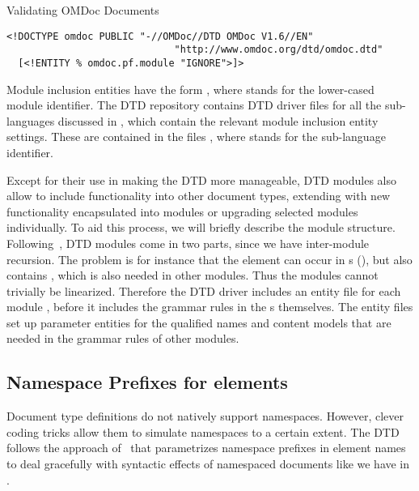 \begin{module}[id=validating]
\begin{omgroup}[id=validating]{Validating OMDoc Documents}
\begin{lstlisting}[index={omdoc,DOCTYPE,ENTITY,INGNORE}]
<!DOCTYPE omdoc PUBLIC "-//OMDoc//DTD OMDoc V1.6//EN"
                             "http://www.omdoc.org/dtd/omdoc.dtd"
  [<!ENTITY % omdoc.pf.module "IGNORE">]>
\end{lstlisting}

Module inclusion entities have the form {}, where
{} stands for the lower-cased module identifier. The {\omdoc} DTD
repository contains DTD driver files for all the sub-languages discussed in
{}, which contain the relevant module inclusion entity
settings. These are contained in the files {}, where
{} stands for the sub-language identifier.

Except for their use in making the {\omdoc} DTD more manageable, DTD modules also allow to
include {\omdoc} functionality into other document types, extending {\omdoc} with new
functionality encapsulated into modules or upgrading selected {\omdoc} modules
individually. To aid this process, we will briefly describe the module structure.
Following~\cite{AltBou:mox01}, DTD modules come in two parts, since we have inter-module
recursion. The problem is for instance that the {} element can occur in
{s} ({}), but also contains {},
which is also needed in other modules. Thus the modules cannot trivially be linearized.
Therefore the DTD driver includes an entity file {} for each
module {}, before it includes the grammar rules in the
{s} {} themselves. The entity files
set up parameter entities for the qualified names and content models that are needed in
the grammar rules of other modules.


\subsection{Namespace Prefixes for {\omdoc} elements}\label{subsec:namespace-magic}  
Document type definitions do not natively support {\xml}
namespaces. However, clever coding tricks allow them to simulate
namespaces to a certain extent. The {\omdoc} DTD follows the approach
of~\cite{AltBou:mox01} that parametrizes namespace prefixes in element names to deal
gracefully with syntactic effects of namespaced documents like we have in {\omdoc}.
  

\end{omgroup}
\end{module}
